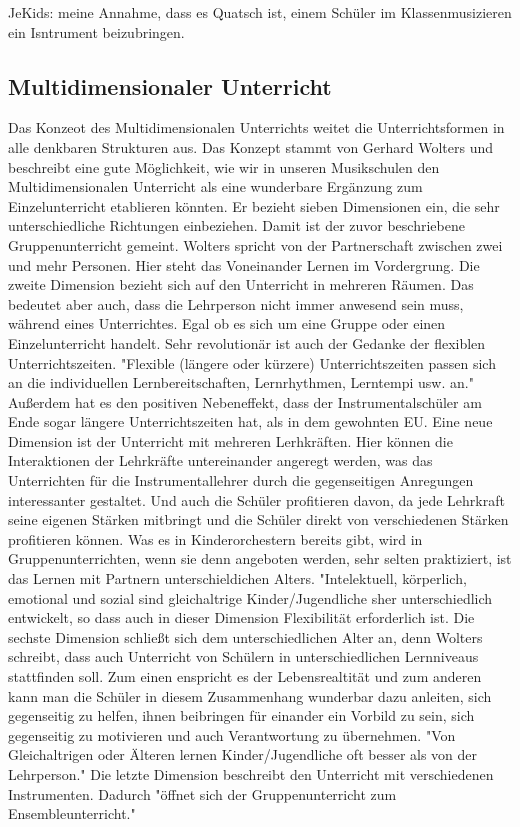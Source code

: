 JeKids: meine Annahme, dass es Quatsch ist, einem Schüler im Klassenmusizieren
ein Isntrument beizubringen.




\subsection{Multidimensionaler Unterricht} 
Das Konzeot des Multidimensionalen Unterrichts weitet die Unterrichtsformen in
alle denkbaren Strukturen aus. Das Konzept stammt von Gerhard Wolters und
beschreibt eine gute Möglichkeit, wie wir in unseren Musikschulen den
Multidimensionalen Unterricht als eine wunderbare Ergänzung zum Einzelunterricht
etablieren könnten. Er bezieht sieben Dimensionen ein, die sehr unterschiedliche
Richtungen einbeziehen. \autocite[86ff]{ernst:die_zukunftsfaehige_musikschule}
Damit ist der zuvor beschriebene Gruppenunterricht gemeint. Wolters spricht von
der Partnerschaft zwischen zwei und mehr Personen. Hier steht das Voneinander
Lernen im Vordergrung. Die zweite Dimension bezieht sich auf den Unterricht in
mehreren Räumen. Das bedeutet aber auch, dass die Lehrperson nicht immer
anwesend sein muss, während eines Unterrichtes. Egal ob es sich um eine Gruppe
oder einen Einzelunterricht handelt. Sehr revolutionär ist auch der Gedanke der
flexiblen Unterrichtszeiten. "Flexible (längere oder kürzere) Unterrichtszeiten
passen sich an die individuellen Lernbereitschaften, Lernrhythmen, Lerntempi
usw. an." \autocite[87]{ernst:die_zukunftsfaehige_musikschule} Außerdem hat es
den positiven Nebeneffekt, dass der Instrumentalschüler am Ende sogar längere
Unterrichtszeiten hat, als in dem gewohnten EU. Eine neue Dimension ist der
Unterricht mit mehreren Lerhkräften. Hier können die Interaktionen der
Lehrkräfte untereinander angeregt werden, was das Unterrichten für die
Instrumentallehrer durch die gegenseitigen Anregungen interessanter gestaltet.
Und auch die Schüler profitieren davon, da jede Lehrkraft seine eigenen Stärken
mitbringt und die Schüler direkt von verschiedenen Stärken profitieren können.
Was es in Kinderorchestern bereits gibt, wird in Gruppenunterrichten, wenn sie
denn angeboten werden, sehr selten praktiziert, ist das Lernen mit Partnern
unterschieldichen Alters. "Intelektuell, körperlich, emotional und sozial sind
gleichaltrige Kinder/Jugendliche sher unterschiedlich entwickelt, so dass auch
in dieser Dimension Flexibilität erforderlich ist.
\autocite[87]{ernst:die_zukunftsfaehige_musikschule} Die sechste Dimension
schließt sich dem unterschiedlichen Alter an, denn Wolters schreibt, dass auch
Unterricht von Schülern in unterschiedlichen Lernniveaus stattfinden soll. Zum
einen enspricht es der Lebensrealtität und zum anderen kann man die Schüler in
diesem Zusammenhang wunderbar dazu anleiten, sich gegenseitig zu helfen, ihnen
beibringen für einander ein Vorbild zu sein, sich gegenseitig zu motivieren und
auch Verantwortung zu übernehmen. "Von Gleichaltrigen oder Älteren lernen
Kinder/Jugendliche oft besser als von der Lehrperson."
\autocite[87]{ernst:die_zukunftsfaehige_musikschule} Die letzte Dimension
beschreibt den Unterricht mit verschiedenen Instrumenten. Dadurch "öffnet sich
der Gruppenunterricht zum Ensembleunterricht."
\autocite[87]{ernst:die_zukunftsfaehige_musikschule}
